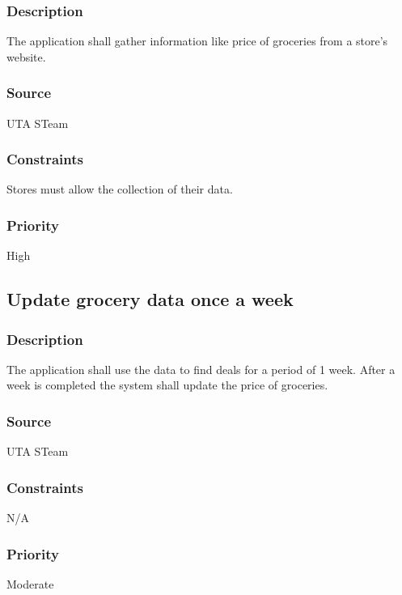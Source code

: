 \subsubsection{Description}
The application shall gather information like price of groceries from a store's website.  
\subsubsection{Source}
UTA STeam
\subsubsection{Constraints}
Stores must allow the collection of their data.
\subsubsection{Priority}
High
\subsection{Update grocery data once a week}
\subsubsection{Description}
The application shall use the data to find deals for a period of 1 week. After a week is completed the system shall update the price of groceries.  
\subsubsection{Source}
UTA STeam
\subsubsection{Constraints}
N/A
\subsubsection{Priority}
Moderate